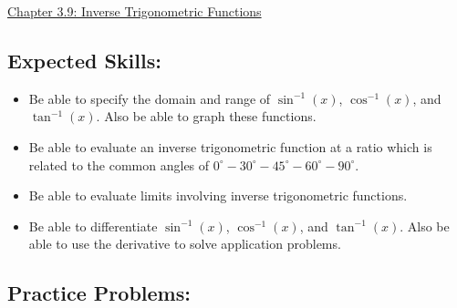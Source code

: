 \documentclass[12pt]{article}
\begin{document}
\begin{center}
\underline{\LARGE{Chapter 3.9: Inverse Trigonometric Functions}}
\end{center}

\subsection*{Expected Skills:}

\begin{itemize}

\item Be able to specify the domain and range of $\sin^{-1}(x)$, $\cos^{-1}(x)$, and $\tan^{-1}(x)$.  Also be able to graph these functions.

\item Be able to evaluate an inverse trigonometric function at a ratio which is related to the common angles of $0^\circ-30^\circ-45^\circ-60^\circ-90^\circ$.

\item Be able to evaluate limits involving inverse trigonometric functions.

\item Be able to differentiate $\sin^{-1}(x)$, $\cos^{-1}(x)$, and $\tan^{-1}(x)$.  Also be able to use the derivative to solve application problems.

\end{itemize}

\subsection*{Practice Problems: }
\end{document}
